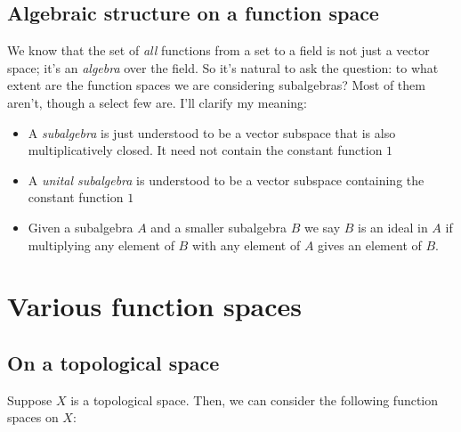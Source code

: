 \documentclass[a4paper]{amsart}
\begin{document}
\subsection{Algebraic structure on a function space}

We know that the set of {\em all} functions from a set to a field is
not just a vector space; it's an {\em algebra} over the field. So it's
natural to ask the question: to what extent are the function spaces we
are considering subalgebras? Most of them aren't, though a select few
are. I'll clarify my meaning:

\begin{itemize}

\item A {\em subalgebra} is just understood to be a vector subspace
  that is also multiplicatively closed. It need not contain the
  constant function $1$

\item A {\em unital subalgebra} is understood to be a vector subspace
  containing the constant function $1$

\item Given a subalgebra $A$ and a smaller subalgebra $B$ we say $B$
  is an ideal in $A$ if multiplying any element of $B$ with any
  element of $A$ gives an element of $B$.

\end{itemize}


\section{Various function spaces}

\subsection{On a topological space}

Suppose $X$ is a topological space. Then, we can consider the
following function spaces on $X$:
\end{document}
